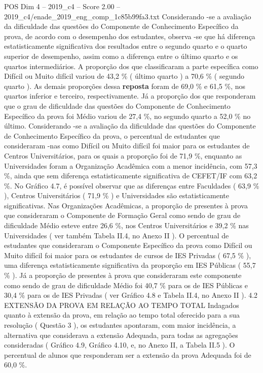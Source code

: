 \begin{textsample}{POS Dim 4 – 2019\_c4 – Score 2.00 – 2019\_c4/enade\_2019\_eng\_comp\_1c85b99fa3.txt}
Considerando -se a avaliação da dificuldade das questões do Componente de Conhecimento Específico da prova, de acordo com o desempenho dos estudantes, observa -se que há diferença estatisticamente significativa dos resultados entre o segundo quarto e o quarto superior de desempenho, assim como a diferença entre o último quarto e os quartos intermediários.
A proporção dos que classificaram a parte específica como Difícil ou Muito difícil variou de 43,2 \% ( último quarto ) a 70,6 \% ( segundo quarto ).
As demais proporções dessa \textbf{reposta} foram de 69,0 \% e 61,5 \%, nos quartos inferior e terceiro, respectivamente.
Já a proporção dos que responderam que o grau de dificuldade das questões do Componente de Conhecimento Específico da prova foi Médio variou de 27,4 \%, no segundo quarto a 52,0 \% no último.
Considerando -se a avaliação da dificuldade das questões do Componente de Conhecimento Específico da prova, o percentual de estudantes que consideraram -nas como Difícil ou Muito difícil foi maior para os estudantes de Centros Universitários, para os quais a proporção foi de 71,9 \%, enquanto as Universidades foram a Organização Acadêmica com a menor incidência, com 57,3 \%, ainda que sem diferença estatisticamente significativa de CEFET/IF com 63,2 \%.
No Gráfico 4.7, é possível observar que as diferenças entre Faculdades ( 63,9 \% ), Centros Universitários ( 71,9 \% ) e Universidades são estatisticamente significativas.
Nas Organizações Acadêmicas, a proporção de presentes à prova que consideraram o Componente de Formação Geral como sendo de grau de dificuldade Médio esteve entre 26,6 \%, nos Centros Universitários e 39,2 \% nas Universidades ( ver também Tabela II.4, no Anexo II ).
O percentual de estudantes que consideraram o Componente Específico da prova como Difícil ou Muito difícil foi maior para os estudantes de cursos de IES Privadas ( 67,5 \% ), uma diferença estatisticamente significativa da proporção em IES Públicas ( 55,7 \% ).
Já a proporção de presentes à prova que consideraram este componente como sendo de grau de dificuldade Médio foi 40,7 \% para os de IES Públicas e 30,4 \% para os de IES Privadas ( ver Gráfico 4.8 e Tabela II.4, no Anexo II ). 4.2 EXTENSÃO DA PROVA EM RELAÇÃO AO TEMPO TOTAL Indagados quanto à extensão da prova, em relação ao tempo total oferecido para a sua resolução ( Questão 3 ), os estudantes apontaram, com maior incidência, a alternativa que considerava a extensão Adequada, para todas as agregações consideradas ( Gráfico 4.9, Gráfico 4.10, e, no Anexo II, a Tabela II.5 ).
O percentual de alunos que responderam ser a extensão da prova Adequada foi de 60,0 \%.

\end{textsample}
